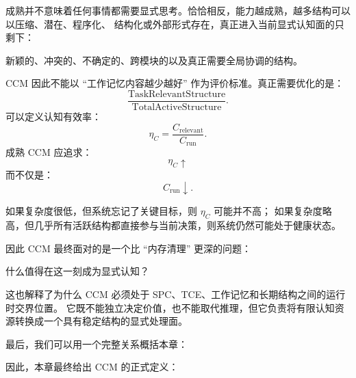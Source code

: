 成熟并不意味着任何事情都需要显式思考。恰恰相反，能力越成熟，越多结构可以以压缩、潜在、程序化、
结构化或外部形式存在，真正进入当前显式认知面的只剩下：
\begin{statementbox}
新颖的、冲突的、不确定的、跨模块的以及真正需要全局协调的结构。
\end{statementbox}

CCM 因此不能以 ``工作记忆内容越少越好'' 作为评价标准。真正需要优化的是：
\[
\boxed{
\frac{
\mathrm{TaskRelevantStructure}
}{
\mathrm{TotalActiveStructure}
}.
}
\]
可以定义认知有效率：
\[
\eta_C
=
\frac{
C_{\mathrm{relevant}}
}{
C_{\mathrm{run}}
}.
\]
成熟 CCM 应追求：
\[
\eta_C\uparrow
\]
而不仅是：
\[
C_{\mathrm{run}}\downarrow.
\]

如果复杂度很低，但系统忘记了关键目标，则 $\eta_C$ 可能并不高；
如果复杂度略高，但几乎所有活跃结构都直接参与当前决策，则系统仍然可能处于健康状态。

因此 CCM 最终面对的是一个比 ``内存清理'' 更深的问题：
\begin{statementbox}
什么值得在这一刻成为显式认知？
\end{statementbox}

这也解释了为什么 CCM 必须处于 SPC、TCE、工作记忆和长期结构之间的运行时交界位置。
它既不能独立决定价值，也不能取代推理，但它负责将有限认知资源转换成一个具有稳定结构的显式处理面。

最后，我们可以用一个完整关系概括本章：

\begin{statementbox}
\centering
{}
\end{statementbox}

因此，本章最终给出 CCM 的正式定义：

